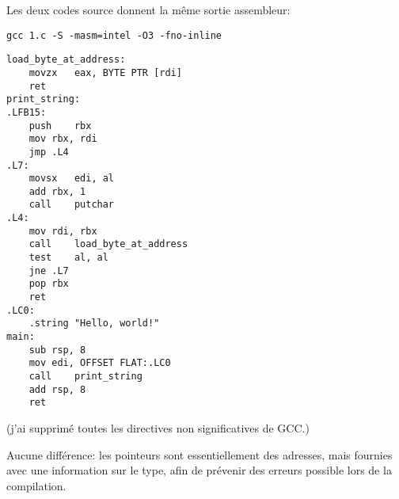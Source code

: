 Les deux codes source donnent la même sortie assembleur:

\begin{lstlisting}
gcc 1.c -S -masm=intel -O3 -fno-inline
\end{lstlisting}

\begin{lstlisting}[style=customasmx86]
load_byte_at_address:
	movzx	eax, BYTE PTR [rdi]
	ret
print_string:
.LFB15:
	push	rbx
	mov	rbx, rdi
	jmp	.L4
.L7:
	movsx	edi, al
	add	rbx, 1
	call	putchar
.L4:
	mov	rdi, rbx
	call	load_byte_at_address
	test	al, al
	jne	.L7
	pop	rbx
	ret
.LC0:
	.string	"Hello, world!"
main:
	sub	rsp, 8
	mov	edi, OFFSET FLAT:.LC0
	call	print_string
	add	rsp, 8
	ret
\end{lstlisting}

(j'ai supprimé toutes les directives non significatives de GCC.)

Aucune différence: les pointeurs \CCpp sont essentiellement des adresses, mais fournies
avec une information sur le type, afin de prévenir des erreurs possible lors de la
compilation.
